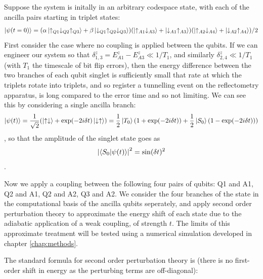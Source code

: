 \documentclass{report}
\begin{document}
Suppose the system is initally in an arbitrary codespace state, with each of the ancilla pairs starting in triplet states:
\begin{equation*}
    \ket{\psi(t = 0)} = (\alpha\ket{\uparrow_{Q1}\downarrow_{Q2}\uparrow_{Q3}} + \beta\ket{\downarrow_{Q1}\uparrow_{Q2}\downarrow_{Q3}})(\ket{\uparrow_{A1}\downarrow_{A3}} + \ket{\downarrow_{A1}\uparrow_{A3}})(\ket{\uparrow_{A2}\downarrow_{A4}} + \ket{\downarrow_{A2}\uparrow_{A4}}) / 2
\end{equation*}
First consider the case where no coupling is applied between the qubits. If we can engineer our system so that $\delta_{1,3}^z = E_{A1}^z - E_{A3}^z \ll 1/T_1$, and similarly $\delta_{2,4}^z \ll 1/T_1$ (with $T_1$ the timescale of bit flip errors), then the energy difference between the two branches of each qubit singlet is sufficiently small that rate at which the triplets rotate into triplets, and so register a tunnelling event on the reflectometry apparatus, is long compared to the error time and so not limiting. We can see this by considering a single ancilla branch:
\begin{equation}
    \ket{\psi(t)} = \frac{1}{\sqrt{2}}(\ket{\uparrow\downarrow} + \exp(-2i\delta t)\ket{\downarrow\uparrow}) = \frac{1}{2}\ket{T_0}(1 + \exp(-2i\delta t)) + \frac{1}{2}\ket{S_0}(1 - \exp(-2i\delta t)))
\end{equation} \label{eq:triplet_to_singlet}, so that the amplitude of the singlet state goes as 
\begin{equation*}
    \left|\braket{S_0|\psi(t)}\right|^2 = \sin(\delta t)^2
\end{equation*}.

Now we apply a coupling between the following four pairs of qubits: Q1 and A1, Q2 and A1, Q2 and A2, Q3 and A2. We consider the four branches of the state in the computational basis of the ancilla qubits seperately, and apply second order perturbation theory to approximate the energy shift of each state due to the adiabatic application of a weak coupling, of strength $t$. The limits of this approximate treatment will be tested using a numerical simulation developed in chapter \ref{chap:methods}.

The standard formula for second order perturbation theory is (there is no first-order shift in energy as the perturbing terms are off-diagonal):
\end{document}

